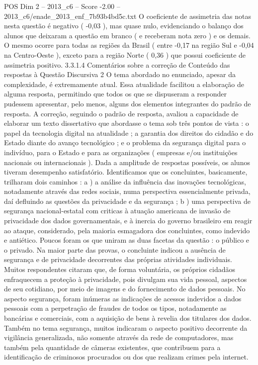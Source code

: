 \begin{textsample}{POS Dim 2 – 2013\_c6 – Score -2.00 – 2013\_c6/enade\_2013\_enf\_7b93b4bd5c.txt}
O coeficiente de assimetria das notas nesta questão é negativo ( -0,03 ), mas quase nulo, evidenciando o balanço dos alunos que deixaram a questão em branco ( e receberam nota zero ) e os demais.
O mesmo ocorre para todas as regiões da Brasil ( entre -0,17 na região Sul e -0,04 na Centro-Oeste ), exceto para a região Norte ( 0,36 ) que possui coeficiente de assimetria positivo. 3.3.1.4 Comentários sobre a correção de Conteúdo das respostas à Questão Discursiva 2 O tema abordado no enunciado, apesar da complexidade, é extremamente atual.
Essa atualidade facilitou a elaboração de alguma resposta, permitindo que todos os que se dispuseram a responder pudessem apresentar, pelo menos, alguns dos elementos integrantes do padrão de resposta.
A correção, seguindo o padrão de resposta, avaliou a capacidade de elaborar um texto dissertativo que abordasse o tema sob três pontos de vista : o papel da tecnologia digital na atualidade ; a garantia dos direitos do cidadão e do Estado diante do avanço tecnológico ; e o problema da segurança digital para o indivíduo, para o Estado e para as organizações ( empresas e/ou instituições nacionais ou internacionais ).
Dada a amplitude de respostas possíveis, os alunos tiveram desempenho satisfatório.
Identificamos que os concluintes, basicamente, trilharam dois caminhos : a ) a análise da influência das inovações tecnológicas, notadamente através das redes sociais, numa perspectiva essencialmente privada, daí defluindo as questões da privacidade e da segurança ; b ) uma perspectiva de segurança nacional-estatal com criticas à atuação americana de invasão de privacidade dos dados governamentais, e à inercia do governo brasileiro em reagir ao ataque, considerado, pela maioria esmagadora dos concluintes, como indevido e antiético.
Poucos foram os que uniram as duas facetas da questão : o público e o privado.
Na maior parte das provas, o concluinte indicou a ausência de segurança e de privacidade decorrentes das próprias atividades individuais.
Muitos respondentes citaram que, de forma voluntária, os próprios cidadãos enfraquecem a proteção à privacidade, pois divulgam sua vida pessoal, aspectos de seu cotidiano, por meio de imagens e do fornecimento de dados pessoais.
No aspecto segurança, foram inúmeras as indicações de acessos indevidos a dados pessoais com a perpetração de fraudes de todos os tipos, notadamente as bancárias e comerciais, com a aquisição de bens à revelia dos titulares dos dados.
Também no tema segurança, muitos indicaram o aspecto positivo decorrente da vigilância generalizada, não somente através da rede de computadores, mas também pela quantidade de câmeras existentes, que contribuem para a identificação de criminosos procurados ou dos que realizam crimes pela internet.

\end{textsample}
